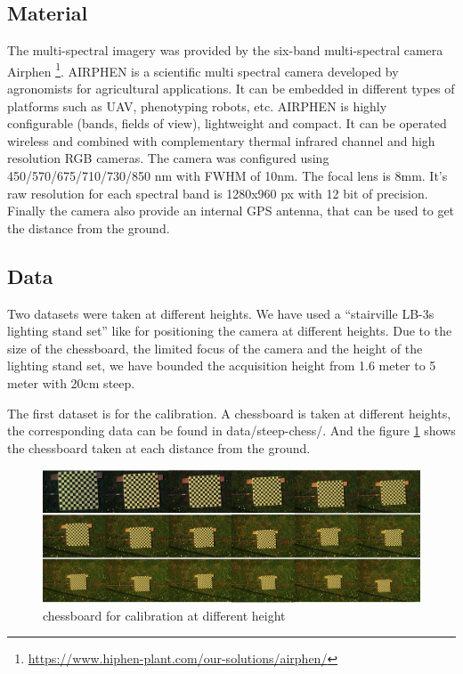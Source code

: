 \documentclass[]{elsarticle}
\begin{document}
	\subsection{Material}
	
	The multi-spectral imagery was provided by the six-band multi-spectral camera Airphen \footnote{\url{https://www.hiphen-plant.com/our-solutions/airphen/}}.
	AIRPHEN is a scientific multi spectral camera developed by agronomists for agricultural applications.
	It can be embedded in different types of platforms such as UAV, phenotyping robots, etc.
	AIRPHEN is highly configurable (bands, fields of view), lightweight and compact.
	It can be operated wireless and combined with complementary thermal infrared channel and high resolution RGB cameras.
	The camera was configured using 450/570/675/710/730/850 nm with FWHM of 10nm.
	The focal lens is 8mm. It's raw resolution for each spectral band is 1280x960 px with 12 bit of precision.
	Finally the camera also provide an internal GPS antenna, that can be used to get the distance from the ground.
	
	
	\subsection{Data}
	
	Two datasets were taken at different heights.
	We have used a ``stairville LB-3s lighting stand set'' like for positioning the camera at different heights.
	Due to the size of the chessboard, the limited focus of the camera and the height of the lighting stand set,
	we have bounded the acquisition height from 1.6 meter to 5 meter with 20cm steep.
	
	The first dataset is for the calibration. A chessboard is taken at different heights, the corresponding data can be found in data/steep-chess/.
	And the figure \ref{fig:calibration} shows the chessboard taken at each distance from the ground.
	
	\begin{figure}[!htb]
		\centering
		\includegraphics[width=\linewidth]{../figures/calibration-height.jpg}
		\caption{chessboard for calibration at different height}
		\label{fig:calibration}
	\end{figure}
	
\end{document}
